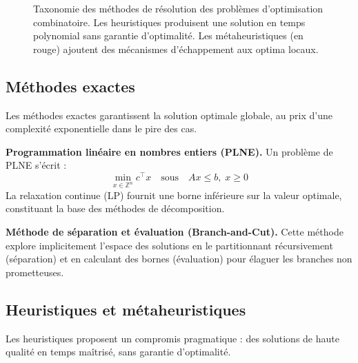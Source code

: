 \documentclass[12pt, a4paper, twoside, openright]{book}
\newcommand{\Z}{\mathbb{Z}}
\begin{document}
\begin{figure}[H]
{%
		}
		\caption{Taxonomie des méthodes de résolution des problèmes d'optimisation
			combinatoire. Les heuristiques produisent une solution en temps
			polynomial sans garantie d'optimalité. Les métaheuristiques
			(en rouge) ajoutent des mécanismes d'échappement aux optima locaux.}
		\label{fig:taxonomie_methodes}
	\end{figure}
	
	\subsection{Méthodes exactes}
	\label{subsec:methodes_exactes}
	
	Les méthodes exactes garantissent la solution optimale globale, au prix
	d'une complexité exponentielle dans le pire des cas.
	
	\textbf{Programmation linéaire en nombres entiers (PLNE).}
	Un problème de PLNE s'écrit :
	$$
	\min_{x \in \Z^n} c^\top x \quad \text{sous} \quad
	Ax \leq b, \; x \geq 0
	$$
	La relaxation continue (LP) fournit une borne inférieure sur la valeur
	optimale, constituant la base des méthodes de décomposition.
	
	\textbf{Méthode de séparation et évaluation (Branch-and-Cut).}
	Cette méthode explore implicitement l'espace des solutions en le
	partitionnant récursivement (séparation) et en calculant des bornes
	(évaluation) pour élaguer les branches non prometteuses.
	
	\subsection{Heuristiques et métaheuristiques}
	\label{subsec:heuristiques_meta}
	
	Les heuristiques proposent un compromis pragmatique : des solutions de
	haute qualité en temps maîtrisé, sans garantie d'optimalité.
	
\end{document}

